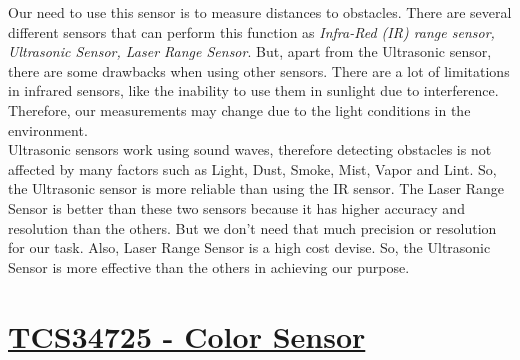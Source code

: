 \documentclass[a4paper,11pt,twocolumn]{article}
\begin{document}
	
Our need to use this sensor is to measure distances to obstacles. There are several different sensors that can perform this function as \textit{Infra-Red (IR) range sensor, Ultrasonic Sensor, Laser Range Sensor}. But, apart from the Ultrasonic sensor, there are some drawbacks when using other sensors. There are a lot of limitations in infrared sensors, like the inability to use them in sunlight due to interference\cite{noauthor_ultrasonic_2017}. Therefore, our measurements may change due to the light conditions in the environment.\\ Ultrasonic sensors work using sound waves, therefore detecting obstacles is not affected by many factors such as Light, Dust, Smoke, Mist, Vapor and Lint. So, the Ultrasonic sensor is more reliable than using the IR sensor. The Laser Range Sensor is better than these two sensors because it has higher accuracy and resolution  than the others. But we don't need that much precision or resolution for our task. Also, Laser Range Sensor is a high cost devise. So, the Ultrasonic Sensor is more effective than the others in achieving our purpose.


\section*{\underline{TCS34725 - Color Sensor}}
\end{document}
